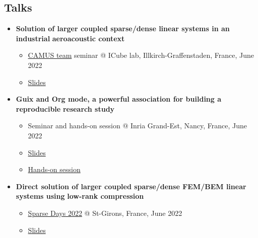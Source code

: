 \documentclass[a4paper, 11pt]{article}
\begin{document}
\subsection*{Talks}
\label{sec:org5399215}
\begin{itemize}
\item \textbf{Solution of larger coupled sparse/dense linear systems in an industrial}
\textbf{aeroacoustic context}
\begin{itemize}
\item \href{https://team.inria.fr/camus/}{CAMUS team} seminar @ ICube lab,
Illkirch-Graffenstaden, France, June 2022
\item \begin{center}
\end{center}
\href{https://thesis-mfelsoci.gitlabpages.inria.fr/slides/camus/camus.pdf}{Slides}
\end{itemize}
\item \textbf{Guix and Org mode, a powerful association for building a reproducible}
\textbf{research study}
\begin{itemize}
\item Seminar and hands-on session @ Inria Grand-Est, Nancy, France, June 2022
\item \begin{center}
\end{center}
\href{https://tuto-techno-guix-hpc.gitlabpages.inria.fr/slides/tuto-techno-guix-hpc.pdf}{Slides}
\item \begin{center}
\end{center}
\href{https://tuto-techno-guix-hpc.gitlabpages.inria.fr/guidelines/}{Hands-on
session}
\end{itemize}
\item \textbf{Direct solution of larger coupled sparse/dense FEM/BEM linear systems using}
\textbf{low-rank compression}
\begin{itemize}
\item \href{https://sparsedays.cerfacs.fr/}{Sparse Days 2022} @ St-Girons, France,
June 2022
\item \begin{center}
\end{center}
\href{https://thesis-mfelsoci.gitlabpages.inria.fr/slides/sparse-days/sparse-days.pdf}{Slides}

\end{itemize}
\end{itemize}
\end{document}
